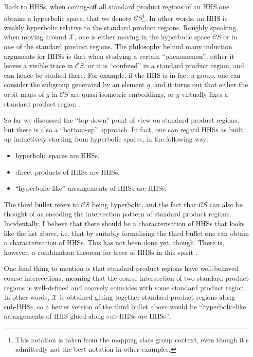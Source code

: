 \documentclass[11pt,oneside]{amsart}
\theoremstyle{definition}
\newcommand{\cuco}[1]{{\mathcal #1}}
\newcommand{\fontact}{{\mathcal C}}
\begin{document}
Back to HHSs, when coning-off all standard product regions of an HHS one obtains a hyperbolic space, that we denote $\fontact S$\footnote{This notation is taken from the mapping class group context, even though it's admittedly not the best notation in other examples.}. In other words, an HHS is weakly hyperbolic relative to the standard product regions. Roughly speaking, when moving around $\cuco X$, one is either moving in the hyperbolic space $\fontact S$ or in one of the standard product regions. The philosophy behind many induction arguments for HHSs is that when studying a certain ``phenomenon'', either it leaves a visible trace in $\fontact S$, or it is ``confined'' in a standard product region, and can hence be studied there. For example, if the HHS is in fact a group, one can consider the subgroup generated by an element $g$, and it turns out that either the orbit maps of $g$ in $\fontact S$ are quasi-isometric embeddings, or $g$ virtually fixes a standard product region \cite{HHS_boundary}.

So far we discussed the ``top-down'' point of view on standard product regions, but there is also a ``bottom-up'' approach. In fact, one can regard HHSs as built up inductively starting from hyperbolic spaces, in the following way:
\begin{itemize}
 \item hyperbolic spaces are HHSs,
 \item direct products of HHSs are HHSs,
 \item ``hyperbolic-like'' arrangements of HHSs are HHSs.
\end{itemize}

The third bullet refers to $\fontact S$ being hyperbolic, and the fact that $\fontact S$ can also be thought of as encoding the intersection pattern of standard product regions. Incidentally, I believe that there should be a characterisation of HHSs that looks like the list above, i.e. that by suitably formalising the third bullet one can obtain a characterisation of HHSs. This has not been done yet, though. There is, however, a combination theorem for trees of HHSs in this spirit \cite{HHS2}.

One final thing to mention is that standard product regions have well-behaved coarse intersections, meaning that the coarse intersection of two standard product regions is well-defined and coarsely coincides with some standard product region. In other words, $\cuco X$ is obtained gluing together standard product regions along sub-HHSs, so a better version of the third bullet above would be ``hyperbolic-like arrangements of HHS glued along sub-HHSs are HHSs''.
\end{document}
